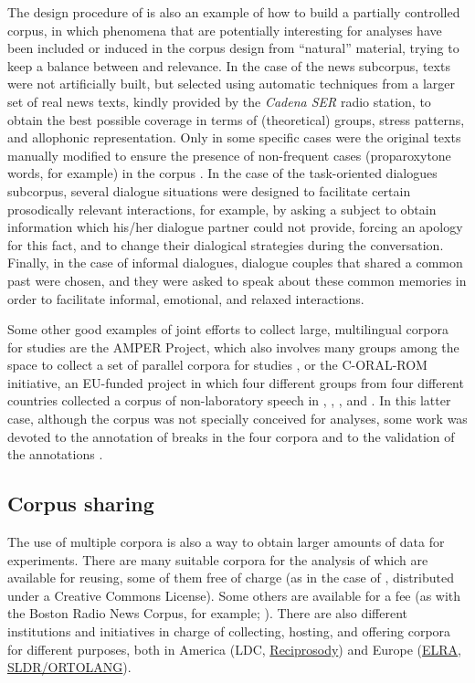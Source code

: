 \documentclass[output=paper]{langsci/langscibook}
\begin{document}
The design procedure of  is also an example of how to build a partially controlled corpus, in which phenomena that are potentially interesting for  analyses have been included or induced in the corpus design from ``natural'' material, trying to keep a balance between  and relevance. In the case of the news subcorpus, texts were not artificially built, but selected using automatic techniques from a larger set of real news texts, kindly provided by the \textit{Cadena SER} radio station, to obtain the best possible coverage in terms of (theoretical)  groups, stress patterns, and allophonic representation. Only in some specific cases were the original texts manually modified to ensure the presence of non-frequent cases (proparoxytone words, for example) in the corpus \citep{Escudero2009,Escudero2010}. In the case of the task-oriented dialogues subcorpus, several dialogue situations were designed to facilitate certain prosodically relevant interactions, for example, by asking a subject to obtain information which his/her dialogue partner could not provide, forcing an apology for this fact, and to change their dialogical strategies during the conversation. Finally, in the case of informal dialogues, dialogue couples that shared a common past were chosen, and they were asked to speak about these common memories in order to facilitate informal, emotional, and relaxed interactions.

Some other good examples of joint efforts to collect large, multilingual corpora for  studies are the AMPER Project, which also involves many groups among the  space to collect a set of parallel corpora for  studies \citep{Contini2002,Contini2003}, or the C-ORAL-ROM initiative, an EU-funded project in which four different groups from four different countries collected a corpus of non-laboratory speech in , , , and  \citep{Cresti2005}. In this latter case, although the corpus was not specially conceived for  analyses, some work was devoted to the annotation of  breaks in the four corpora and to the validation of the annotations \citep{Danieli2004,Danieli2005}.

\subsection{Corpus sharing}

The use of multiple corpora is also a way to obtain larger amounts of data for experiments. There are many suitable corpora for the analysis of  which are available for reusing, some of them free of charge (as in the case of , distributed under a Creative Commons License). Some others are available for a fee (as with the Boston Radio News Corpus, for example; \citealt{Ostendorf1995}). There are also different institutions and initiatives in charge of collecting, hosting, and offering corpora for different purposes, both in America (LDC, \href{https://github.com/fahmidur/reciprosody/blob/master/README.md}{Reciprosody}) and Europe (\href{http://www.elra.info/en/}{ELRA}, \href{http://www.sldr.fr/}{SLDR/ORTOLANG}).
\end{document}
